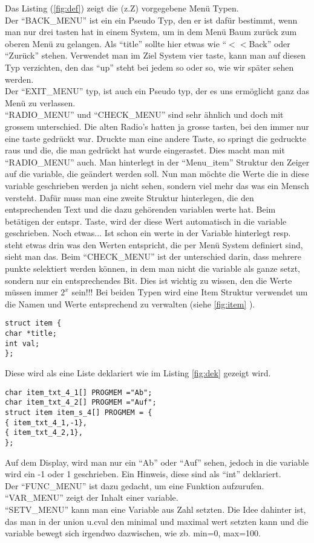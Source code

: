 \documentclass[a4paper]{article}
\begin{document}
Das Listing (\ref{fig:def}) zeigt die (z.Z) vorgegebene Men\"u Typen. \\
Der ``BACK\_MENU'' ist ein ein Pseudo Typ, den er ist dafür bestimmt, wenn man nur drei tasten hat in einem System, um in dem Menü Baum zurück zum oberen Menü zu gelangen. Als ``title'' sollte hier etwas wie ``$<$$<$Back'' oder ``Zurück'' stehen. Verwendet man im Ziel System vier taste, kann man auf diesen Typ verzichten, den das ``up'' steht bei jedem so oder so, wie wir später sehen werden.\\
Der ``EXIT\_MENU'' typ, ist auch ein Pseudo typ, der es uns ermöglicht ganz das Menü zu verlassen. \\
``RADIO\_MENU'' und ``CHECK\_MENU'' sind sehr ähnlich und doch mit grossem unterschied. Die alten Radio's hatten ja grosse tasten, bei den immer nur eine taste gedrückt war. Druckte man eine andere Taste, so springt die gedruckte raus und die, die man gedrückt hat wurde eingerastet. Dies macht man mit ``RADIO\_MENU'' auch. Man hinterlegt in der ``Menu\_item'' Struktur den Zeiger auf die variable, die geändert werden soll. Nun man möchte die Werte die in diese variable geschrieben werden ja nicht sehen, sondern viel mehr das was ein Mensch versteht. Dafür muss man eine zweite Struktur hinterlegen, die den entsprechenden Text und die dazu gehörenden variablen werte hat. Beim betätigen der entspr. Taste, wird der diese Wert automatisch in die variable geschrieben. Noch etwas... Ist schon ein werte in der Variable hinterlegt resp. steht etwas drin was den Werten entspricht, die per Menü System definiert sind, sieht man das. Beim ``CHECK\_MENU'' ist der unterschied darin, dass mehrere punkte selektiert werden können, in dem man nicht die variable als ganze setzt, sondern nur ein entsprechendes Bit. Dies ist wichtig zu wissen, den die Werte müssen immer $2^x$ sein!!! Bei beiden Typen wird eine Item Struktur verwendet um die Namen und Werte entsprechend zu verwalten (siehe \ref{fig:item} ).\\
\begin{lstlisting}[label=fig:item,caption={Definition der Menu Typen}]
struct item {
char *title;
int val;
};
\end{lstlisting}
Diese wird als eine Liste deklariert wie im Listing \ref{fig:dek} gezeigt wird.
\begin{lstlisting}[label=fig:dek,caption={Definition der Menu Typen}]
char item_txt_4_1[] PROGMEM ="Ab";
char item_txt_4_2[] PROGMEM ="Auf";
struct item item_s_4[] PROGMEM = { 
{ item_txt_4_1,-1},
{ item_txt_4_2,1},
};
\end{lstlisting}
Auf dem Display, wird man nur ein ``Ab'' oder ``Auf'' sehen, jedoch in die variable wird ein -1 oder 1 geschrieben. Ein Hinweis, diese sind als ``int'' deklariert. \\
Der ``FUNC\_MENU'' ist dazu gedacht, um eine Funktion aufzurufen. \\
``VAR\_MENU'' zeigt der Inhalt einer variable. \\
``SETV\_MENU'' kann man eine Variable aus Zahl setzten. Die Idee dahinter ist, das man in der union u.cval den minimal und maximal wert setzten kann und die variable bewegt sich irgendwo dazwischen, wie zb. min=0, max=100.\\
\end{document}
